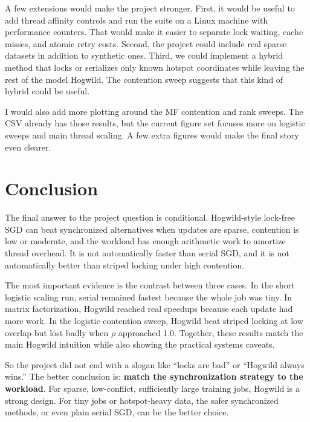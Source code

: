 \documentclass[11pt]{article}
\begin{document}
A few extensions would make the project stronger. First, it would be useful to add thread affinity controls and run the suite on a Linux machine with performance counters. That would make it easier to separate lock waiting, cache misses, and atomic retry costs. Second, the project could include real sparse datasets in addition to synthetic ones. Third, we could implement a hybrid method that locks or serializes only known hotspot coordinates while leaving the rest of the model Hogwild. The contention sweep suggests that this kind of hybrid could be useful.

I would also add more plotting around the MF contention and rank sweeps. The CSV already has those results, but the current figure set focuses more on logistic sweeps and main thread scaling. A few extra figures would make the final story even clearer.

\section{Conclusion}

The final answer to the project question is conditional. Hogwild-style lock-free SGD can beat synchronized alternatives when updates are sparse, contention is low or moderate, and the workload has enough arithmetic work to amortize thread overhead. It is not automatically faster than serial SGD, and it is not automatically better than striped locking under high contention.

The most important evidence is the contrast between three cases. In the short logistic scaling run, serial remained fastest because the whole job was tiny. In matrix factorization, Hogwild reached real speedups because each update had more work. In the logistic contention sweep, Hogwild beat striped locking at low overlap but lost badly when \(\rho\) approached 1.0. Together, these results match the main Hogwild intuition while also showing the practical systems caveats.

So the project did not end with a slogan like ``locks are bad'' or ``Hogwild always wins.'' The better conclusion is: \textbf{match the synchronization strategy to the workload}. For sparse, low-conflict, sufficiently large training jobs, Hogwild is a strong design. For tiny jobs or hotspot-heavy data, the safer synchronized methods, or even plain serial SGD, can be the better choice.
\end{document}
